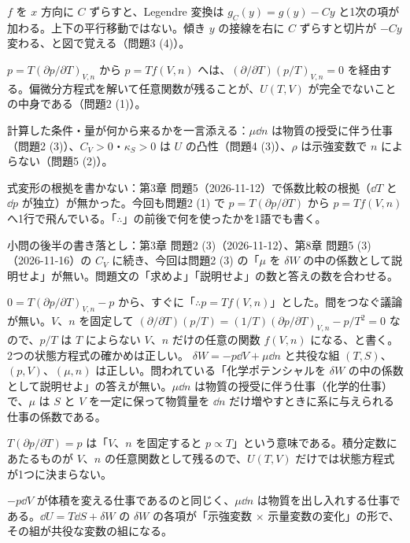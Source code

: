 \begin{daiji}
  \item $f$ を $x$ 方向に $C$ ずらすと、Legendre 変換は $g_{C}(y)=g(y)-Cy$ と1次の項が加わる。上下の平行移動ではない。傾き $y$ の接線を右に $C$ ずらすと切片が $-Cy$ 変わる、と図で覚える（問題3 (4)）。
  \item $p=T(\partial p/\partial T)_{V,n}$ から $p=Tf(V,n)$ へは、$(\partial/\partial T)(p/T)_{V,n}=0$ を経由する。偏微分方程式を解いて任意関数が残ることが、$U(T,V)$ が完全でないことの中身である（問題2 (1)）。
  \item 計算した条件・量が何から来るかを一言添える：$\mu\dd n$ は物質の授受に伴う仕事（問題2 (3)）、$C_{V}>0$・$\kappa_{S}>0$ は $U$ の凸性（問題4 (3)）、$\rho$ は示強変数で $n$ によらない（問題5 (2)）。
\end{daiji}
\begin{maemo}
  \item 式変形の根拠を書かない：第3章 問題5（2026-11-12）で係数比較の根拠（$\dd T$ と $\dd p$ が独立）が無かった。今回も問題2 (1) で $p=T(\partial p/\partial T)$ から $p=Tf(V,n)$ へ1行で飛んでいる。「$\therefore$」の前後で何を使ったかを1語でも書く。
  \item 小問の後半の書き落とし：第3章 問題2 (3)（2026-11-12）、第8章 問題5 (3)（2026-11-16）の $C_{V}$ に続き、今回は問題2 (3) の「$\mu$ を $\delta W$ の中の係数として説明せよ」が無い。問題文の「求めよ」「説明せよ」の数と答えの数を合わせる。
\end{maemo}
\begin{kotaeran}
   $0=T(\partial p/\partial T)_{V,n}-p$ から、すぐに「$\therefore p=Tf(V,n)$」とした。間をつなぐ議論が無い。$V$、$n$ を固定して $(\partial/\partial T)(p/T)=(1/T)(\partial p/\partial T)_{V,n}-p/T^{2}=0$ なので、$p/T$ は $T$ によらない $V$、$n$ だけの任意の関数 $f(V,n)$ になる、と書く。2つの状態方程式の確かめは正しい。
   $\delta W=-p\dd V+\mu\dd n$ と共役な組 $(T,S)$、$(p,V)$、$(\mu,n)$ は正しい。問われている「化学ポテンシャルを $\delta W$ の中の係数として説明せよ」の答えが無い。$\mu\dd n$ は物質の授受に伴う仕事（化学的仕事）で、$\mu$ は $S$ と $V$ を一定に保って物質量を $\dd n$ だけ増やすときに系に与えられる仕事の係数である。
\end{kotaeran}
\begin{rikai}
  \item $T(\partial p/\partial T)=p$ は「$V$、$n$ を固定すると $p\propto T$」という意味である。積分定数にあたるものが $V$、$n$ の任意関数として残るので、$U(T,V)$ だけでは状態方程式が1つに決まらない。
  \item $-p\dd V$ が体積を変える仕事であるのと同じく、$\mu\dd n$ は物質を出し入れする仕事である。$\dd U=T\dd S+\delta W$ の $\delta W$ の各項が「示強変数 $\times$ 示量変数の変化」の形で、その組が共役な変数の組になる。
\end{rikai}
